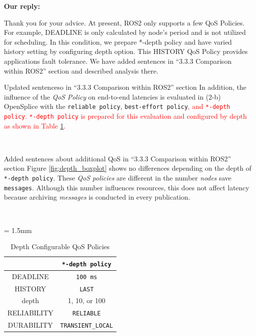 \documentclass{article}
\begin{document}
\begin{enumerate}
  \begin{flushleft}
    \textbf{Our reply:}
  \end{flushleft}
  Thank you for your advice.
  At present, ROS2 only supports a few QoS Policies.
  For example, DEADLINE is only calculated by node's period and is not utilized for scheduling.
  In this condition, we prepare *-depth policy and have varied history setting by configuring depth option.
  This HISTORY QoS Policy provides applications fault tolerance.
  We have added sentences in ``3.3.3 Comparison within ROS2'' section and described analysis there.
  \begin{itembox}[|]{Updated sentenceso in ``3.3.3 Comparison within ROS2'' section}
    In addition, the influence of the \emph{QoS Policy} on end-to-end latencies is evaluated in (2-b) OpenSplice with the \texttt{reliable policy}, \texttt{best-effort policy}\textcolor{red}{, and \texttt{*-depth policy}.
    \texttt{*-depth policy} is prepared for this evaluation and configured by depth as shown in Table \ref{tb:depth_qos}.}
  \end{itembox}\\
  \begin{itembox}[|]{Added sentences about additional QoS in ``3.3.3 Comparison within ROS2'' section}
    Figure \ref{fig:depth_boxplot} shows no differences depending on the depth of \texttt{*-depth policy}.
    These \emph{QoS policies} are different in the number \emph{nodes} save \texttt{messages}.
    Although this number influences resources, this does not affect latency because archiving \emph{messages} is conducted in every publication.
  \end{itembox}\\
  \renewcommand{\arraystretch}{1.0}
  \setcounter{table}{4}
  \begin{table}[H]
    \caption{\label{tb:depth_qos}Depth Configurable QoS Policies}
    \centering
    \tabcolsep = 1.5mm              %
    \begin{tabular}{c|c}
      \hline
      & \textbf{\texttt{*-depth policy} }\\
      \hline
      \hline
      DEADLINE & \texttt{100 ms}\\
      HISTORY & \texttt{LAST}\\
      depth & 1, 10, or 100\\
      RELIABILITY & \texttt{RELIABLE}\\
      DURABILITY & \texttt{TRANSIENT\_LOCAL}\\
      \hline
    \end{tabular}

\end{table}
\end{enumerate}
\end{document}
